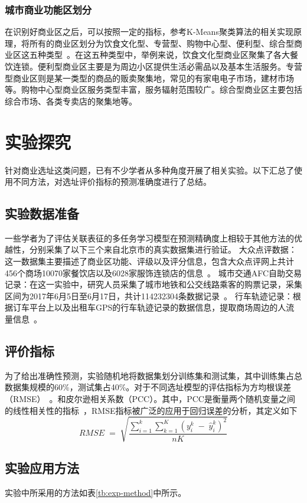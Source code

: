 \documentclass{llncs}
\begin{document}
\subsubsection{城市商业功能区划分}
在识别好商业区之后，可以按照一定的指标，参考K-Means聚类算法的相关实现原理，将所有的商业区划分为饮食文化型、专营型、购物中心型、便利型、综合型商业区这五种类型~\cite{frandsen2015automatic}。在这五种类型中，举例来说，饮食文化型商业区聚集了各大餐饮连锁。便利型商业区主要是为周边小区提供生活必需品以及基本生活服务。专营型商业区则是某一类型的商品的贩卖聚集地，常见的有家电电子市场，建材市场等。购物中心型商业区服务类型丰富，服务辐射范围较广。综合型商业区主要包括综合市场、各类专卖店的聚集地等。

\section{实验探究}
针对商业选址这类问题，已有不少学者从多种角度开展了相关实验。以下汇总了使用不同方法，对选址评价指标的预测准确度进行了总结。
\subsection{实验数据准备}
一些学者为了评估关联表征的多任务学习模型在预测精确度上相较于其他方法的优越性，分别采集了以下三个来自北京市的真实数据集进行验证。
大众点评数据：这一数据集主要描述了商业区功能、评级以及评分信息，包含大众点评网上共计456个商场10070家餐饮店以及6028家服饰连锁店的信息~\cite{xia2018dazhongdianping}。
城市交通AFC自助交易记录：在这一实验中，研究人员采集了城市地铁和公交线路乘客的购票记录，采集区间为2017年6月5日至6月17日，共计114232304条数据记录~\cite{huang2018beijingtraffic}。
行车轨迹记录：根据订车平台上以及出租车GPS的行车轨迹记录的数据信息，提取商场周边的人流量信息~\cite{cai2017didi}。
\subsection{评价指标}
为了给出准确性预测，实验随机地将数据集划分训练集和测试集，其中训练集占总数据集规模的60\%，测试集占40\%。对于不同选址模型的评估指标为方均根误差（RMSE）~\cite{fortin2015should}。和皮尔逊相关系数（PCC）。其中，PCC是衡量两个随机变量之间的线性相关性的指标~\cite{schober2018correlation}，RMSE指标被广泛的应用于回归误差的分析，其定义如下
$$RMSE\;=\;\sqrt{\frac{{\displaystyle\sum_{i=1}^k}{\displaystyle\sum_{k=1}^K}\left(y_i^k\;-\;\widehat y_i^k\right)^2}{nK}}$$
\subsection{实验应用方法}
实验中所采用的方法如表\ref{tb:exp-method}中所示。
\end{document}
